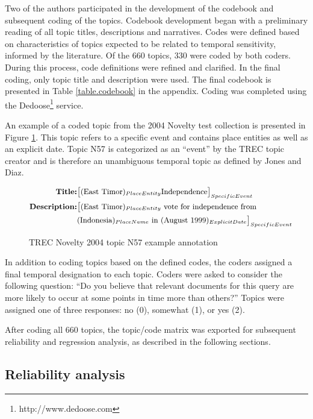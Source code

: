 \documentclass[runningheads,a4paper]{llncs}
\begin{document}
Two of the authors participated in the development of the codebook and subsequent coding of the topics. Codebook development began with a preliminary reading of all topic titles, descriptions and narratives. Codes were defined based on characteristics of topics expected to be related to temporal sensitivity, informed by the literature. Of the 660 topics, 330 were coded by both coders. During this process, code definitions were refined and clarified. In the final coding, only topic title and description were used. The final codebook is presented in Table \ref{table.codebook} in the appendix. Coding was completed using the Dedoose\footnote{http://www.dedoose.com} service.  

An example of a coded topic from the 2004 Novelty test collection is presented in Figure \ref{fig.example}.  This topic refers to a specific event and contains place entities as well as an explicit date.  Topic N57 is categorized as an ``event'' by the TREC topic creator and is therefore an unambiguous temporal topic as defined by Jones and Diaz.

\begin{figure}
\begin{equation*}
\small
\begin{split}
\mbox{\bf{Title}:} & \big[(\mbox{East Timor})_{PlaceEntity} \mbox{Independence}\big]_{SpecificEvent} \\
\mbox{\bf{Description}:} & \big[  (\mbox{East Timor})_{PlaceEntity} \mbox{ vote for independence from } \\
	& (\mbox{Indonesia})_{PlaceName} \mbox{ in } (\mbox{August 1999})_{ExplicitDate}\big]_{SpecificEvent}
\end{split}
\end{equation*}
\caption{TREC Novelty 2004 topic N57 example annotation}
\label{fig.example}
\end{figure}

In addition to coding topics based on the defined codes, the coders assigned a final temporal designation to each topic. Coders were asked to consider the following question: ``Do you believe that relevant documents for this query are more likely to occur at some points in time more than others?'' Topics were assigned one of three responses: no (0), somewhat (1), or yes (2).
 
After coding all 660 topics, the topic/code matrix was exported for subsequent reliability and regression analysis, as described in the following sections. 

\subsection{Reliability analysis}
\end{document}
